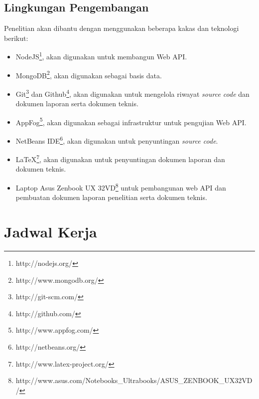 \documentclass[a4paper, 12pt]{report}
\begin{document}
\subsection*{Lingkungan Pengembangan}
\onehalfspacing Penelitian akan dibantu dengan menggunakan beberapa kakas dan teknologi berikut:
\begin{itemize}
  \item NodeJS\footnote{http://nodejs.org/}, akan digunakan untuk membangun Web API.
  \item MongoDB\footnote{http://www.mongodb.org/}, akan digunakan sebagai basis data.
  \item Git\footnote{http://git-scm.com/} dan Github\footnote{http://github.com/}, akan digunakan untuk mengelola riwayat \textit{source code} dan dokumen laporan serta dokumen teknis.
  \item AppFog\footnote{http://www.appfog.com/}, akan digunakan sebagai infrastruktur untuk pengujian Web API.
  \item NetBeans IDE\footnote{http://netbeans.org/}, akan digunakan untuk penyuntingan \textit{source code}.
  \item LaTeX\footnote{http://www.latex-project.org/}, akan digunakan untuk penyuntingan dokumen laporan dan dokumen teknis.
  \item Laptop Asus Zenbook UX 32VD\footnote{http://www.asus.com/Notebooks\_Ultrabooks/ASUS\_ZENBOOK\_UX32VD/} untuk pembangunan web API dan pembuatan dokumen laporan penelitian serta dokumen teknis.
\end{itemize}

\section*{Jadwal Kerja}
\begin{flushleft}
  \begin{gantt}{10}{8}
    \begin{ganttitle}
    \end{ganttitle}
  \end{gantt}
\end{flushleft}
\end{document}
